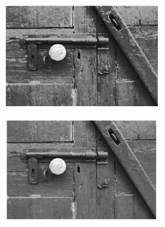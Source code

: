 \documentclass{article}
\begin{document}
\begin{figure}[H]
    \begin{subfigure}{0.5\textwidth}
        \includegraphics[width=0.9\textwidth]{puertita1-1.png} 
    \end{subfigure}\hfill
    \begin{subfigure}{0.5\textwidth}
        \includegraphics[width=0.9\textwidth]{puertita1-200.png} 
    \end{subfigure}
\end{figure}
\end{document}
